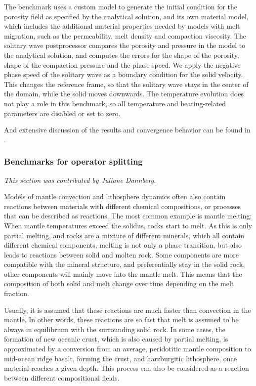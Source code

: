 \documentclass{article}
\begin{document}


The benchmark uses a custom model to generate the initial condition for the porosity field as specified by the analytical solution, and its own material model, which includes the additional material properties needed by models with melt migration, such as the permeability, melt density and compaction viscosity. The solitary wave postprocessor compares the porosity and pressure in the model to the analytical solution, and computes the errors for the shape of the porosity, shape of the compaction pressure and the phase speed.
We apply the negative phase speed of the solitary wave as a boundary condition for the solid velocity. This changes the reference frame, so that the solitary wave stays in the center of the domain, while the solid moves downwards. The temperature evolution does not play a role in this benchmark, so all temperature and heating-related parameters are disabled or set to zero.

And extensive discussion of the results and convergence behavior can be found in \cite{dannberg_melt}.

\subsubsection{Benchmarks for operator splitting}
\label{sec:benchmark-operator_splitting}

\textit{This section was contributed by Juliane Dannberg.}

Models of mantle convection and lithosphere dynamics often also contain reactions between materials with different chemical compositions, or processes that can be described as reactions.
The most common example is mantle melting: When mantle temperatures exceed the solidus, rocks start to melt. As this is only partial melting, and rocks are a mixture of different minerals, which all contain different chemical components, melting is not only a phase transition, but also leads to reactions between solid and molten rock. Some components are more compatible with the mineral structure, and preferentially stay in the solid rock, other components will mainly move into the mantle melt. This means that the composition of both solid and melt change over time depending on the melt fraction.

Usually, it is assumed that these reactions are much faster than convection in the mantle. In other words, these reactions are so fast that melt is assumed to be always in equilibrium with the surrounding solid rock. In some cases, the formation of new oceanic crust, which is also caused by partial melting, is approximated by a conversion from an average, peridotitic mantle composition to mid-ocean ridge basalt, forming the crust, and harzburgitic lithosphere, once material reaches a given depth. This process can also be considered as a reaction between different compositional fields.
\end{document}
